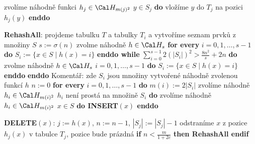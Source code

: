 \documentclass[a4paper,12pt]{article}
\begin{document}
\phantom{---------------}zvolíme náhodně funkci $
h_j\in \Cal H_{m(j)^2}$\newline 
\phantom{------------}{\bf enddo}\newline 
\phantom{------------}{\bf for every} $y\in S_j$ {\bf do} vložíme $
y$ do $T_j$ na pozici $h_j(y)$ {\bf enddo}\newline 
\phantom{---------}{\bf endif}\newline 
\phantom{------}{\bf endif}\newline 
\phantom{---}{\bf else}\newline 
\phantom{------}{\bf RehashAll}\newline 
\phantom{---}{\bf endif\newline 
endif}


{\bf RehashAll}:\newline 
projdeme tabulku $T$ a tabulky $T_i$ a vytvoříme seznam 
prvků z množiny $S$\newline 
$s:=\sigma(n)$\newline 
zvolme náhodně $h\in \Cal H_s$ \newline 
{\bf for every} $i=0,1,\dots,s-1$ {\bf do} $S_i:=\{x\in 
S\mid h(x)=i\}$ {\bf enddo\newline 
while} $\sum_{i=0}^{s-1}2(|S_i|)^2>\frac {8n^2}s+2n$ {\bf do}\newline 
\phantom{---}zvolme náhodně $h\in \Cal H_s$ \newline 
\phantom{---}{\bf for every} $i=0,1,\dots,s-1$ {\bf do} $
S_i:=\{x\in S\mid h(x)=i\}$ {\bf enddo}\newline 
{\bf enddo}\newline
Komentář: zde $S_i$ jsou množiny vytvořené náhodně zvolenou 
funkcí $h$ \newline 
$n:=0$ \newline 
{\bf for every} $i=0,1,\dots,s-1$ {\bf do}\newline 
\phantom{---}$m(i):=2|S_i|$\newline 
\phantom{---}zvolíme náhodně $h_i\in \Cal H_{m(i
)^2}$\newline 
\phantom{---}{\bf while} $h_i$ není prostá na množině $
S_i$ {\bf do}\newline 
\phantom{------}zvolíme náhodně $h_i\in \Cal H_{m(i)^2}$\newline 
\phantom{---}{\bf enddo\newline 
enddo\newline 
for every} $x\in S$ {\bf do INSERT$(x)$ enddo}


{\bf DELETE$(x)$}:\newline 
$j:=h(x)$, $n:=n-1$, $|S_j|:=|S_j|-1$\newline 
odstraníme $x$ z pozice $h_j(x)$ v tabulce $T_j$, pozice bude prázdná \newline 
{\bf if} $n<\frac m{1+2c}$ {\bf then RehashAll endif}
\end{document}

